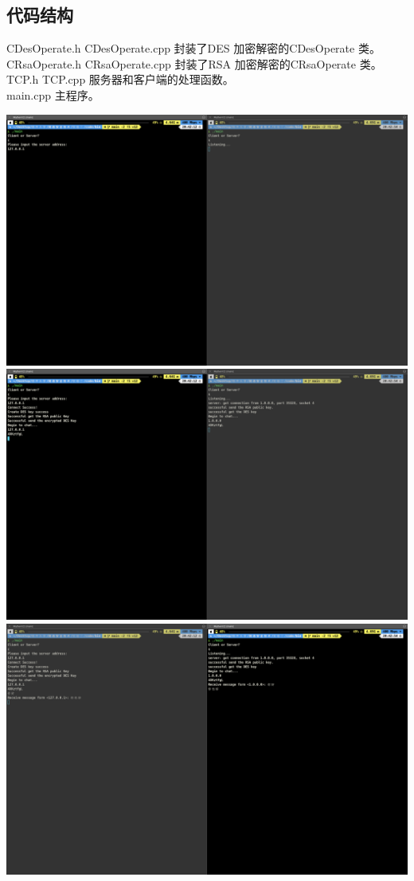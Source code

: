 \documentclass[UTF8,a4paper,10pt]{ctexart}
\begin{document}
\subsection{代码结构}
\noindent CDesOperate.h CDesOperate.cpp 封装了DES 加密解密的CDesOperate 类。\\
CRsaOperate.h CRsaOperate.cpp 封装了RSA 加密解密的CRsaOperate 类。\\
TCP.h TCP.cpp 服务器和客户端的处理函数。\\
main.cpp 主程序。\\
\begin{center}
  \includegraphics*[]{1}
  \includegraphics*[]{2}
  \includegraphics*[]{3}

\end{center}
\end{document}
